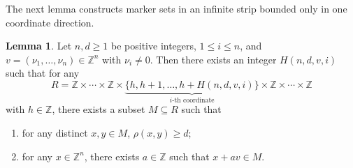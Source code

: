 \documentclass{amsart}
\theoremstyle{definition}
\newtheorem{lemma}[theorem]{Lemma}
\begin{document}
The next lemma constructs marker sets in an infinite strip bounded only in
one coordinate direction.

\begin{lemma}\label{lem:generalH}
Let $n, d\geq 1$ be positive integers, $1\leq i\leq n$, and
$v=(\nu_1,\dots, \nu_n)\in\mathbb{Z}^n$ with $\nu_i\neq 0$.
Then there exists an integer $H(n, d, v, i)$ such that for any
\[
R=\mathbb{Z}\times\cdots\times\mathbb{Z}\times
\underbrace{\{h, h+1, \dots, h+H(n, d, v, i)\}}_{\text{$i$-th coordinate}}
\times\mathbb{Z}\times\cdots\times\mathbb{Z}
\]
with $h\in\mathbb{Z}$, there exists a subset $M\subseteq R$ such that
\begin{enumerate}
\item[(1)] for any distinct $x,y\in M$, $\rho(x,y)\geq d$;
\item[(2)] for any $x\in \mathbb{Z}^n$, there exists $a\in\mathbb{Z}$
such that $x+av\in M$.
\end{enumerate}
\end{lemma}
\end{document}
